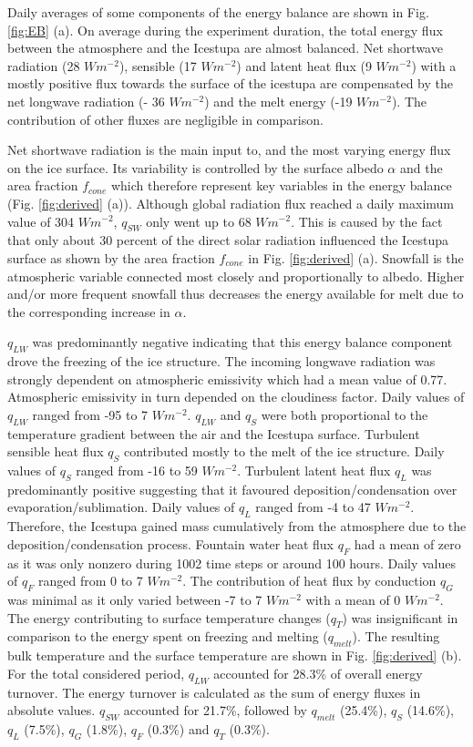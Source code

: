 \documentclass[utf8]{frontiersSCNS} %
\begin{document}
Daily averages of some components of the energy balance are shown in Fig.  \ref{fig:EB} (a). On average during the
experiment duration, the total energy flux between the atmosphere and the Icestupa are almost balanced. Net shortwave
radiation (28 $Wm^{-2}$), sensible (17 $Wm^{-2}$) and latent heat flux (9 $Wm^{-2}$) with a mostly positive flux
towards the surface of the icestupa are compensated by the net longwave radiation (- 36 $Wm^{-2}$) and the melt energy
(-19 $Wm^{-2}$). The contribution of other fluxes are negligible in comparison.

Net shortwave radiation is the main input to, and the most varying energy flux on the ice surface. Its variability is
controlled by the surface albedo $\alpha$ and the area fraction $f_{cone}$ which therefore represent key variables in
the energy balance (Fig. \ref{fig:derived} (a)). Although global radiation flux reached a daily maximum value of 304
$Wm^{-2}$, $q_{SW}$ only went up to 68 $Wm^{-2}$. This is caused by the fact that only about 30 percent of the direct
solar radiation influenced the Icestupa surface as shown by the area fraction $f_{cone}$ in Fig. \ref{fig:derived}
(a).  Snowfall is the atmospheric variable connected most closely and proportionally to albedo.  Higher and/or more
frequent snowfall thus decreases the energy available for melt due to the corresponding increase in $\alpha$. 

$q_{LW}$ was predominantly negative indicating that this energy balance component drove the freezing of the ice
structure. The incoming longwave radiation was strongly dependent on atmospheric emissivity which had a mean value of
0.77. Atmospheric emissivity in turn depended on the cloudiness factor. Daily values of $q_{LW}$ ranged from -95 to 7
$Wm^{-2}$.  $q_{LW}$ and $q_{S}$ were both proportional to the temperature gradient between the air and the Icestupa
surface. Turbulent sensible heat flux $q_{S}$ contributed mostly to the melt of the ice structure. Daily values of
$q_{S}$ ranged from -16 to 59 $Wm^{-2}$. Turbulent latent heat flux $q_{L}$ was predominantly positive suggesting that
it favoured deposition/condensation over evaporation/sublimation. Daily values of $q_{L}$ ranged from -4 to 47
$Wm^{-2}$. Therefore, the Icestupa gained mass cumulatively from the atmosphere due to the deposition/condensation
process. Fountain water heat flux $q_{F}$ had a mean of zero as it was only nonzero during 1002 time steps or around
100 hours. Daily values of $q_{F}$ ranged from 0 to 7 $Wm^{-2}$. The contribution of heat flux by conduction $q_{G}$
was minimal as it only varied between -7 to 7 $Wm^{-2}$ with a mean of 0 $Wm^{-2}$. The energy contributing to surface
temperature changes ($q_{T}$) was insignificant in comparison to the energy spent on freezing and melting
($q_{melt}$).  The resulting bulk temperature and the surface temperature are shown in Fig. \ref{fig:derived} (b).
For the total considered period, $q_{LW}$ accounted for 28.3\% of overall energy turnover. The energy turnover is
calculated as the sum of energy fluxes in absolute values. $q_{SW}$ accounted for 21.7\%, followed by $q_{melt}$
(25.4\%), $q_{S}$ (14.6\%), $q_{L}$ (7.5\%), $q_{G}$ (1.8\%), $q_{F}$ (0.3\%) and $q_{T}$ (0.3\%).
\end{document}
